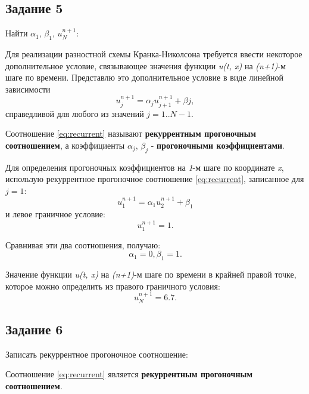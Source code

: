 \documentclass[12pt, a4paper]{report}
\begin{document}
	\subsection*{Задание 5}
	\large
	Найти $\alpha_1$, $\beta_1$, $u_{N}^{n+1}$: \par
	Для реализации разностной схемы Кранка-Николсона требуется ввести некоторое дополнительное условие, связывающее значения функции \textit{u(t, x)} на \textit{(n+1)}-м шаге по времени. Представлю это дополнительное условие в виде линейной зависимости
	\begin{equation}\label{eq:recurrent}
		u_{j}^{n+1} = \alpha_{j} u_{j+1}^{n+1} + \beta{j},
	\end{equation}
	справедливой для любого из значений $j=1..N-1$. \par
	Соотношение \eqref{eq:recurrent} называют \textbf{рекуррентным прогоночным соотношением}, а коэффициенты $\alpha_{j}$, $\beta_{j}$ - \textbf{прогоночными коэффициентами}. \\
	\par
	Для определения прогоночных коэффициентов на \textit{1}-м шаге по координате \textit{x}, использую рекуррентное прогоночное соотношение \eqref{eq:recurrent}, записанное для $j=1$:
	\begin{equation*}
		u_{1}^{n+1} = \alpha_{1} u_{2}^{n+1} + \beta_{1}
	\end{equation*}
	и левое граничное условие:
	\begin{equation*}
		u_{1}^{n+1} = 1.
	\end{equation*}
	\par
	Сравнивая эти два соотношения, получаю:
	\begin{equation*}
		\alpha_{1} = 0, \beta_{1} = 1.
	\end{equation*}
	\par
	Значение функции \textit{u(t, x)} на \textit{(n+1)}-м шаге по времени в крайней правой точке, которое можно определить из правого граничного условия:
	\begin{equation*}
		u_{N}^{n+1} = 6.7.
	\end{equation*}
	
	\subsection*{Задание 6}
	\large
	Записать рекуррентное прогоночное соотношение: \par
	Соотношение \eqref{eq:recurrent} является \textbf{рекуррентным прогоночным соотношением}.
	
\end{document}
